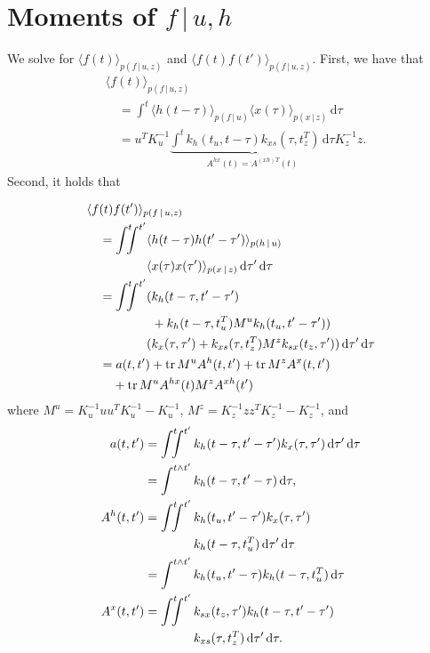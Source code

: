 \documentclass{article}
\newcommand{\tr}{\operatorname{tr}}
\newcommand{\id}[1]{\, \mathrm{d} #1}     %
\newcommand{\cond}{\, | \,}               %
\newcommand{\la}{\langle}
\newcommand{\ra}{\rangle}
\newcommand{\phan}[1]{\hphantom{#1\;}}
\begin{document}
\appendix
\section{Moments of $f\cond u, h$}
\label{app:moments_f}
We solve for $\la f(t) \ra_{p(f\cond u,z)}$ and $\la f(t) f(t') \ra_{p(f\cond u,z)}$. First, we have that
\begin{align*}
    &\la f(t) \ra_{p(f\cond u,z)} \\
    &\quad= \int^t \la h(t - \tau)\ra_{p(f\cond u)} \la x(\tau) \ra_{p(x\cond z)} \id{\tau} \\
    &\quad= u^T K_u^{-1} \underbrace{\int^t k_h(t_u,t-\tau) k_{xs}(\tau, t_z^T) \id{ \tau}}_{A^{hx}(t)=A^{(xh)T}(t)} K_z^{-1} z.
\end{align*}
Second, it holds that

\begin{align*}
    &\la f(t) f(t') \ra_{p(f\cond u,z)} \\
    &\quad= \int^t\!\!\!\!\int^{t'} \la h(t- \tau) h(t' - \tau')\ra_{p(h\cond u)} \\
    &\quad\phan{=\int^t\!\!\!\!\int^{t'}} \la x(\tau) x(\tau') \ra_{p(x\cond z)}\id{\tau'}\id{\tau} \\
    &\quad= \int^t\!\!\!\!\int^{t'} ( k_h(t- \tau,t' - \tau') \\
    &\quad\phan{=\int^t\!\!\!\!\int^{t'} (}+ k_h(t- \tau, t_u^T) M^u k_h(t_u, t' - \tau')) \\
    &\quad\phan{=\int^t\!\!\!\!\int^{t'}}( k_x(\tau,\tau') + k_{xs}(\tau, t_z^T) M^z k_{sx}(t_z, \tau')) \id{\tau'}\id{\tau} \\
    &\quad= a(t,t') + \tr M^u A^{h}(t,t') + \tr M^z A^{x}(t,t') \\
    &\quad\phan{=} + \tr M^u A^{hx}(t) M^z A^{xh}(t')
\end{align*}
where $M^u=K_u^{-1}uu^T K_u^{-1}-K_u^{-1}$, $M^z=K_z^{-1}zz^TK_z^{-1}-K_z^{-1}$, and
\begin{align*}
    a(t,t')&=\int^t\!\!\!\!\int^{t'} k_h(t- \tau,t' - \tau') k_x(\tau,\tau') \id{\tau'}\id{\tau} \\
    &=\int^{t \land t'} k_h(t- \tau,t' - \tau)\id{\tau}, \\
    A^{h}(t,t')&=\int^t\!\!\!\!\int^{t'} k_h(t_{u}, t' - \tau') k_x(\tau,\tau') \\
    &\phan{=\int^t\!\!\!\!\int^{t'}}\, k_h(t- \tau, t_{u}^T) \id{\tau'}\id{\tau}\\
    &=\int^{t \land t'} k_h(t_{u}, t' - \tau)k_h(t- \tau, t_{u}^T) \id{\tau}  \\
    A^{x}(t,t')&=\int^t\!\!\!\!\int^{t'} k_{sx}(t_z, \tau') k_h(t- \tau,t'-\tau') \\
    &\phan{=\int^t\!\!\!\!\int^{t'}}\, k_{xs}(\tau, t_z^T) \id{\tau'}\id{\tau}.
\end{align*}
\end{document}
